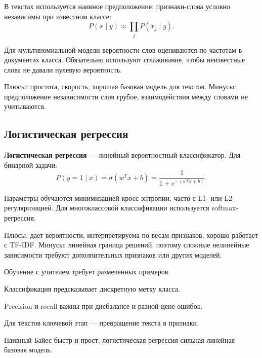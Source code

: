 В текстах используется наивное предположение: признаки-слова условно независимы при известном классе:
\[
P(x\mid y)\approx\prod_j P(x_j\mid y).
\]

Для мультиномиальной модели вероятности слов оцениваются по частотам в документах класса. Обязательно используют сглаживание, чтобы неизвестные слова не давали нулевую вероятность.

Плюсы: простота, скорость, хорошая базовая модель для текстов. Минусы: предположение независимости слов грубое, взаимодействия между словами не учитываются.

\subsection*{Логистическая регрессия}

\textbf{Логистическая регрессия} --- линейный вероятностный классификатор. Для бинарной задачи:
\[
P(y=1\mid x)=\sigma(w^Tx+b)=\frac{1}{1+e^{-(w^Tx+b)}}.
\]

Параметры обучаются минимизацией кросс-энтропии, часто с L1- или L2-регуляризацией. Для многоклассовой классификации используется softmax-регрессия.

Плюсы: дает вероятности, интерпретируема по весам признаков, хорошо работает с TF-IDF. Минусы: линейная граница решений, поэтому сложные нелинейные зависимости требуют дополнительных признаков или других моделей.

\begin{important}
    \item Обучение с учителем требует размеченных примеров.
    \item Классификация предсказывает дискретную метку класса.
    \item Precision и recall важны при дисбалансе и разной цене ошибок.
    \item Для текстов ключевой этап --- превращение текста в признаки.
    \item Наивный Байес быстр и прост; логистическая регрессия сильная линейная базовая модель.
\end{important}
